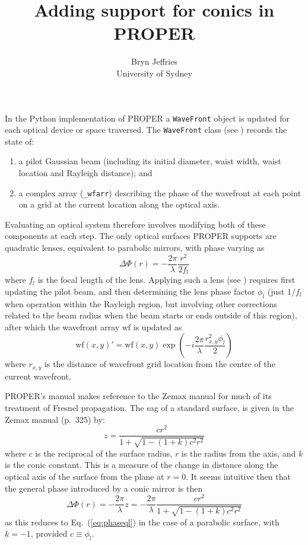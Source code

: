 \documentclass[12pt,a4paper]{article}
\begin{document}
 
\title{Adding support for conics in PROPER} 
\author{Bryn Jeffries\\University of Sydney} 
\maketitle 

In the Python implementation of PROPER a \texttt{WaveFront} object is updated for each optical device or space traversed. The \texttt{WaveFront} class (see ) records the state of:
\begin{enumerate}
\item a pilot Gaussian beam (including its initial diameter, waist width, waist location and Rayleigh distance); and
\item a complex array (\texttt{\_wfarr}) describing the phase of the wavefront at each point on a grid at the current location along the optical axis.
\end{enumerate}

Evaluating an optical system therefore involves modifying both of these components at each step. The only optical surfaces PROPER supports are quadratic lenses, equivalent to parabolic mirrors, with phase varying as
\begin{equation} \label{eq:phaseql}
\Delta\Phi(r) = -\frac{2\pi}{\lambda} \frac{r^2}{2f_l}
\end{equation}
where $f_l$ is the focal length of the lens. Applying such a lens (see ) requires first updating the pilot beam, and then determining the lens phase factor $\phi_l$ (just $1/f_l$ when operation within the Rayleigh region, but involving other corrections related to the beam radius when the beam starts or ends outside of this region), after which the wavefront array $\mathrm{wf}$ is updated as
\begin{equation} \label{eq:updatephaseql}
\mathrm{wf}(x,y)' =\mathrm{wf}(x,y) \exp\left(-i\frac{2\pi}{\lambda}  \frac{r_{x,y}^2\phi_l}{2}\right)
\end{equation}
where $r_{x,y}$ is the distance of wavefront grid location from the centre of the current wavefront.

PROPER's manual makes reference to the Zemax manual for much of its treatment of Fresnel propagation. The sag of a standard surface, is given in the Zemax manual (p.~325) by:
\begin{equation}
z = \frac{cr^2}{1 + \sqrt{1 - (1+k)c^2r^2}}
\end{equation}
where $c$ is the reciprocal of the surface radius, $r$ is the radius from the axis, and $k$ is the conic constant. This is a measure of the change in distance along the optical axis of the surface from the plane at $r=0$. It seems intuitive then that the general phase introduced by a conic mirror is then
\begin{equation}
\Delta\Phi(r) = -\frac{2\pi}{\lambda} z = -\frac{2\pi}{\lambda} \frac{cr^2}{1 + \sqrt{1 - (1+k)c^2r^2}}
\end{equation}
as this reduces to Eq.~(\ref{eq:phaseql}) in the case of a parabolic surface, with $k=-1$, provided $c\equiv\phi_l$.
\end{document}
